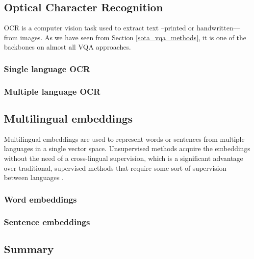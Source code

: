 \subsection{Optical Character Recognition}
\label{sota_ocr}

OCR is a computer vision task used to extract text –printed or handwritten–– from images. As we have seen from Section \ref{sota_vqa_methods}, it is one of the backbones on almost all VQA approaches.

\cite{wang2010word, mishra:hal-00818183}

\subsubsection{Single language OCR}
\label{sota_ocr_single_language}

\cite{}

\subsubsection{Multiple language OCR}
\label{sota_ocr_multiple_language}

\cite{borisyuk2018rosetta}

\subsection{Multilingual embeddings}
\label{sota_embeddings}
Multilingual embeddings are used to represent words or sentences from multiple languages in a single vector space.  Unsupervised methods acquire the embeddings without the need of a cross-lingual supervision, which is a significant advantage over traditional, supervised methods that require some sort of supervision between languages \cite{chen2018unsupervised}.

\cite{TIEDEMANN12.463,mikolov2013exploiting, ferreira2016jointly,DBLP:journals/corr/abs-1810-04805}

\subsubsection{Word embeddings}
\label{sota_word_embeddings}

\cite{klementiev2012inducing, faruqui2014improving,hermann2014multilingual,lauly2014autoencoder, gouws2015bilbowa,levy2015improving, gouws2015bilbowa,luong2015bilingual, joulin2016bag,DBLP:journals/corr/SmithTHH17,conneau2017word,speer2017conceptnet,bojanowski2017enriching,chen2018unsupervised, jawanpuria2019learning}

\subsubsection{Sentence embeddings}
\label{sota_sentence_embeddings}

\cite{le2014distributed, 10.1162/tacl_a_00288}


\subsection{Summary}
\label{sota_summary}


